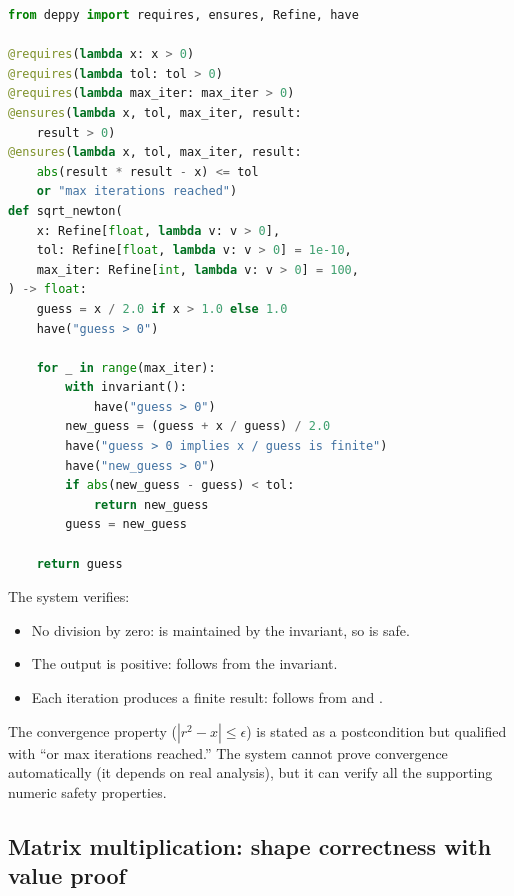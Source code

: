 \documentclass[11pt]{report}
\DeclareRobustCommand{\py}[1]{\texttt{\detokenize{#1}}}
\theoremstyle{definition}
\theoremstyle{plain}
\begin{document}
\begin{lstlisting}[style=deppy,language=Python]
from deppy import requires, ensures, Refine, have

@requires(lambda x: x > 0)
@requires(lambda tol: tol > 0)
@requires(lambda max_iter: max_iter > 0)
@ensures(lambda x, tol, max_iter, result:
    result > 0)
@ensures(lambda x, tol, max_iter, result:
    abs(result * result - x) <= tol
    or "max iterations reached")
def sqrt_newton(
    x: Refine[float, lambda v: v > 0],
    tol: Refine[float, lambda v: v > 0] = 1e-10,
    max_iter: Refine[int, lambda v: v > 0] = 100,
) -> float:
    guess = x / 2.0 if x > 1.0 else 1.0
    have("guess > 0")

    for _ in range(max_iter):
        with invariant():
            have("guess > 0")
        new_guess = (guess + x / guess) / 2.0
        have("guess > 0 implies x / guess is finite")
        have("new_guess > 0")
        if abs(new_guess - guess) < tol:
            return new_guess
        guess = new_guess

    return guess
\end{lstlisting}

The system verifies:
\begin{itemize}[nosep]
  \item No division by zero: \py{guess > 0} is maintained by the invariant,
        so \py{x / guess} is safe.
  \item The output is positive: follows from the invariant.
  \item Each iteration produces a finite result: follows from \py{guess > 0}
        and \py{x > 0}.
\end{itemize}

The convergence property ($|r^2 - x| \leq \epsilon$) is stated as a
postcondition but qualified with ``or max iterations reached.'' The system
cannot prove convergence automatically (it depends on real analysis), but
it can verify all the supporting numeric safety properties.

\subsection{Matrix multiplication: shape correctness with value proof}
\end{document}
